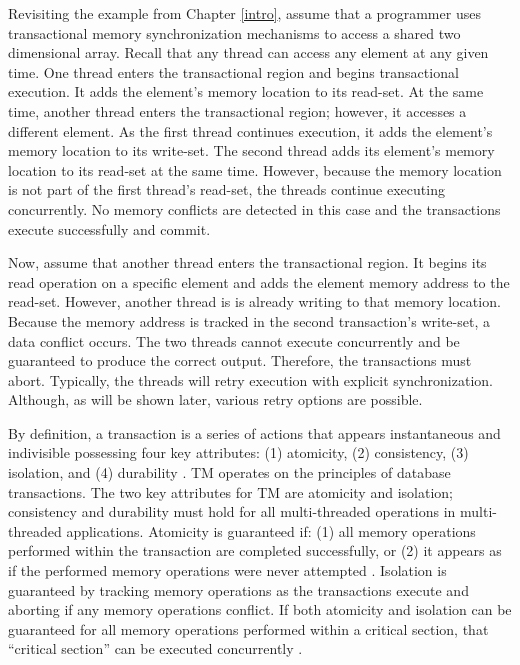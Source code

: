 \documentclass[11pt]{book}
\begin{document}
Revisiting the example from Chapter \ref{intro}, assume that a programmer uses
transactional memory synchronization mechanisms to access a shared two dimensional
array.  Recall that any thread can access any element at any given time.  One thread
enters the transactional region and begins transactional execution.  It adds the element's
memory location to its read-set.  At the same time, another thread enters the
transactional region; however, it accesses a different element.  As the first thread
continues execution, it adds the element's memory location to its write-set.  The second
thread adds its element's memory location to its read-set at the same time.  However,
because the memory location is not part of the first thread's read-set, the threads
continue executing concurrently.  No memory conflicts are detected in this case and the
transactions execute successfully and commit.

Now, assume that another thread enters the transactional region.  It begins its read
operation on a specific element and adds the element memory address to the read-set.
However, another thread is is already writing to that memory location.  Because the memory
address is tracked in the second transaction's write-set, a data conflict occurs.  The two
threads cannot execute concurrently and be guaranteed to produce the correct output.
Therefore, the transactions must abort.  Typically, the threads will retry execution with
explicit synchronization.  Although, as will be shown later, various retry options are
possible. 

By definition, a transaction is a series of actions that appears instantaneous and
indivisible possessing four key attributes: (1) atomicity, (2) consistency, (3) isolation,
and (4) durability \cite{tm_2nd}.  TM operates on the principles of database transactions.
The two key attributes for TM are atomicity and isolation; consistency and durability must
hold for all multi-threaded operations in multi-threaded applications.  Atomicity is
guaranteed if: (1) all memory operations performed within the transaction are completed
successfully, or (2) it appears as if the performed memory operations were never attempted
\cite{tm_2nd}.  Isolation is guaranteed by tracking memory operations as the transactions
execute and aborting if any memory operations conflict.  If both atomicity and isolation
can be guaranteed for all memory operations performed within a critical section, that
``critical section'' can be executed concurrently \cite{sle_rajwar}.
\end{document}
